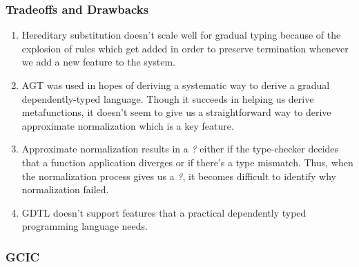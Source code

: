 \documentclass{article}
\theoremstyle{definition}
\newcommand{\Gcode}[1]{{\color{OliveGreen}\textit{#1}}}
\begin{document}
\subsubsection{Tradeoffs and Drawbacks}
\begin{enumerate}
  \item Hereditary substitution doesn't scale well for gradual typing because of
    the explosion of rules which get added in order to preserve termination
    whenever we add a new feature to the system.
  \item AGT was used in hopes of deriving a systematic way to derive a gradual
    dependently-typed language. Though it succeeds in helping us derive
    metafunctions, it doesn't seem to give us a straightforward way to derive
    approximate normalization which is a key feature.
  \item Approximate normalization results in a \Gcode{?} either if the
    type-checker decides that a function application diverges or if there's a
    type mismatch. Thus, when the normalization process gives us a \Gcode{?}, it
    becomes difficult to identify why normalization failed.
  \item GDTL doesn't support features that a practical dependently typed
    programming language needs.
\end{enumerate}

\subsubsection{GCIC}
\end{document}
